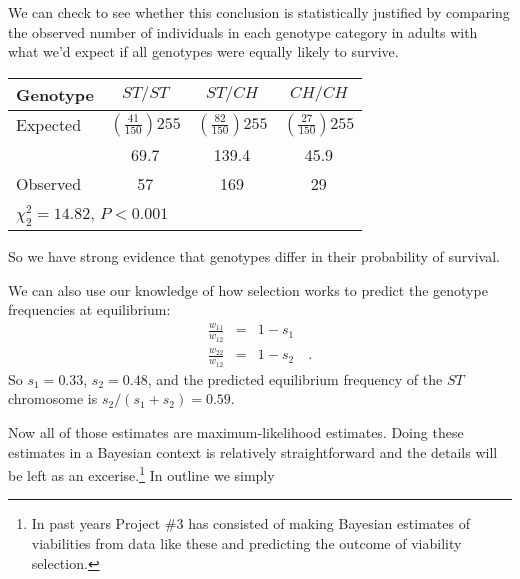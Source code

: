 \documentclass[12pt]{article}
\begin{document}
We can check to see whether this conclusion is statistically justified
by comparing the observed number of individuals in each genotype
category in adults with what we'd expect if all genotypes were equally
likely to survive.
\begin{center}
\begin{tabular}{l|ccc}
\hline\hline
Genotype & $ST/ST$ & $ST/CH$ & $CH/CH$ \\
\hline
Expected & $\left(\frac{41}{150}\right)255$ &
  $\left(\frac{82}{150}\right)255$ & $\left(\frac{27}{150}\right)255$ \\
         & 69.7    & 139.4   & 45.9 \\
Observed & 57      & 169     & 29 \\
\hline
\multicolumn{4}{l}{$\chi^2_2 = 14.82$, $P < 0.001$}
\end{tabular}
\end{center}
So we have strong evidence that genotypes differ in their probability
of survival.

We can also use our knowledge of how selection works to predict the
genotype frequencies at equilibrium:
\begin{eqnarray*}
\frac{w_{11}}{w_{12}} &=& 1 - s_1 \\
\frac{w_{22}}{w_{12}} &=& 1 - s_2 \quad .
\end{eqnarray*}
So $s_1 = 0.33$, $s_2 = 0.48$, and the predicted equilibrium frequency
of the $ST$ chromosome is $s_2/(s_1+s_2) = 0.59$.

Now all of those estimates are maximum-likelihood estimates. Doing
these estimates in a Bayesian context is relatively straightforward
and the details will be left as an excerise.\footnote{In past years
  Project \#3 has consisted of making Bayesian estimates of
  viabilities from data like these and predicting the outcome of
  viability selection.} In outline we simply
\end{document}
